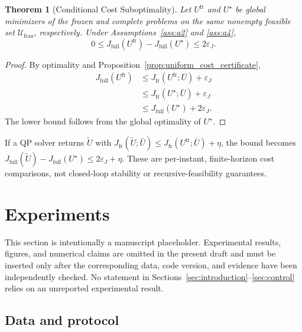 \documentclass[journal]{IEEEtran}
\newtheorem{theorem}{Theorem}
\begin{document}
\begin{theorem}[Conditional Cost Suboptimality]
\label{thm:suboptimality}
Let $U^{\mathrm{fr}}$ and $U^\star$ be global minimizers of the frozen and complete problems on the same nonempty feasible set $\mathcal U_{\mathrm{feas}}$, respectively. Under Assumptions~\ref{ass:a2} and \ref{ass:a4},
\begin{equation}
    0\le J_{\mathrm{full}}(U^{\mathrm{fr}})-J_{\mathrm{full}}(U^\star)
    \le2\varepsilon_J.
    \label{eq:suboptimality_bound}
\end{equation}
\end{theorem}
\begin{proof}
By optimality and Proposition~\ref{prop:uniform_cost_certificate},
\begin{align*}
J_{\mathrm{full}}(U^{\mathrm{fr}})
&\le J_{\mathrm{fr}}(U^{\mathrm{fr}};\bar U)+\varepsilon_J\\
&\le J_{\mathrm{fr}}(U^\star;\bar U)+\varepsilon_J\\
&\le J_{\mathrm{full}}(U^\star)+2\varepsilon_J.
\end{align*}
The lower bound follows from the global optimality of $U^\star$.
\end{proof}
If a QP solver returns $\widetilde U$ with $J_{\mathrm{fr}}(\widetilde U;\bar U)\le J_{\mathrm{fr}}(U^{\mathrm{fr}};\bar U)+\eta$, the bound becomes $J_{\mathrm{full}}(\widetilde U)-J_{\mathrm{full}}(U^\star)\le2\varepsilon_J+\eta$. These are per-instant, finite-horizon cost comparisons, not closed-loop stability or recursive-feasibility guarantees.

\section{Experiments}
\label{sec:experiments}

This section is intentionally a manuscript placeholder. Experimental results, figures, and numerical claims are omitted in the present draft and must be inserted only after the corresponding data, code version, and evidence have been independently checked. No statement in Sections~\ref{sec:introduction}--\ref{sec:control} relies on an unreported experimental result.

\subsection{Data and protocol}
\end{document}
